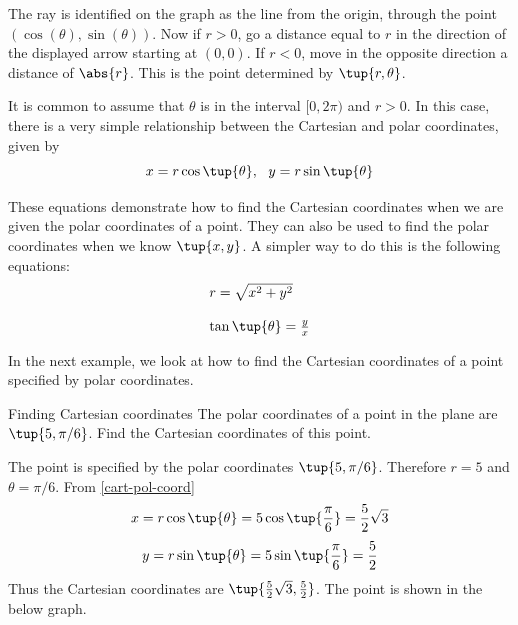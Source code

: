 The ray is identified on the graph as the line from the origin, through the point $(\cos(\theta),\sin(\theta))$. Now if $r>0$, go a distance
equal to $r$ in the direction of the displayed arrow starting at $(0,0)$. If 
$r<0$, move in the opposite direction a distance of $\abs{r}
$. This is the point determined by $\tup{r,\theta }$.

It is common to assume that $\theta $ is in the interval $
[0,2\pi )$ and $r>0$. In this case, there is a very simple relationship
between the Cartesian and polar coordinates, given by
\begin{equation}
x=r\cos \tup{\theta } ,\ \ y=r\sin \tup{\theta } 
\label{cart-pol-coord}
\end{equation}

These equations demonstrate how to find the Cartesian coordinates when we are given the polar coordinates of a point. They can also be used to find the polar coordinates when we know $\tup{x, y }$. A simpler way to do this is the following equations:
\begin{equation}
\begin{array}{l}
r = \sqrt{x^2 + y^2} \\
\\
\tan \tup{\theta} = \frac{y}{x}
\end{array}
\label{pol-cart-coord}
\end{equation}

In the next example, we look at how to find the Cartesian coordinates of a point specified by polar coordinates. 

\begin{example}{Finding Cartesian coordinates}{}
The polar coordinates of a point in the plane are $\tup{5,\pi /6} $.
Find the Cartesian coordinates of this point.
\end{example}

\begin{solution}
The point is specified by the polar coordinates $\tup{5,\pi /6}$. Therefore $r=5$ and $\theta = \pi /6$. 
From \ref{cart-pol-coord}
\[
x= r \cos \tup{\theta }= 5\cos \tup{\vspace{0.05in}\frac{\pi }{6}} = \vspace{0.05in}\frac{5}{2}\sqrt{3}
\]
\[
y= r \sin \tup{\theta } = 5\sin \tup{\vspace{0.05in}\frac{\pi }{6}} = \vspace{0.05in}\frac{5}{2}
\]
Thus the Cartesian coordinates are $\tup{\vspace{0.05in}\frac{5}{2}\sqrt{3}, \vspace{0.05in}\frac{5}{2}}$. The point is shown in the below graph. 

\begin{center}
\end{center}
\end{solution}


